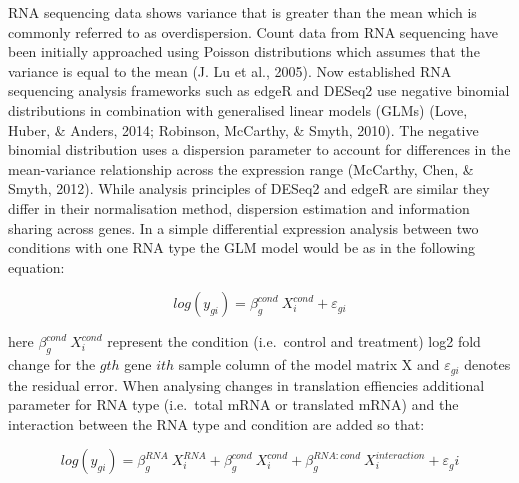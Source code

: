 \documentclass[12pt,openany]{book}
\begin{document}
RNA sequencing data shows variance that is greater than the mean which
is commonly referred to as overdispersion. Count data from RNA
sequencing have been initially approached using Poisson distributions
which assumes that the variance is equal to the mean (J. Lu et al.,
2005). Now established RNA sequencing analysis frameworks such as edgeR
and DESeq2 use negative binomial distributions in combination with
generalised linear models (GLMs) (Love, Huber, \& Anders, 2014;
Robinson, McCarthy, \& Smyth, 2010). The negative binomial distribution
uses a dispersion parameter to account for differences in the
mean-variance relationship across the expression range (McCarthy, Chen,
\& Smyth, 2012). While analysis principles of DESeq2 and edgeR are
similar they differ in their normalisation method, dispersion estimation
and information sharing across genes. In a simple differential
expression analysis between two conditions with one RNA type the GLM
model would be as in the following equation:

\[log(y_{gi}) = \beta_g^{cond}\ X_i^{cond} + \varepsilon_{gi}\]

here \(\beta_g^{cond}\ X_i^{cond}\) represent the condition
(i.e.~control and treatment) log2 fold change for the \(gth\) gene
\(ith\) sample column of the model matrix X and \(\varepsilon_{gi}\)
denotes the residual error. When analysing changes in translation
effiencies additional parameter for RNA type (i.e.~total mRNA or
translated mRNA) and the interaction between the RNA type and condition
are added so that:

\[log(y_{gi}) = \beta_g^{RNA}\ X_i^{RNA}+ \beta_g^{cond}\ X_i^{cond} + \beta_g^{RNA:cond}\ X_i^{interaction} + \varepsilon_gi\]
\end{document}
